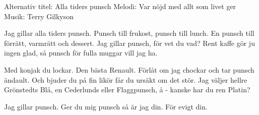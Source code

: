 \begin{song}

\begin{songmeta}
Alternativ titel: Alla tiders punsch
Melodi: Var nöjd med allt som livet ger
Musik: Terry Gilkyson
\end{songmeta}

\begin{songtext}
Jag gillar alla tiders punsch.
Punsch till frukost, punsch till lunch.
En punsch till förrätt, varmrätt och dessert.
Jag gillar punsch, för vet du vad?
Rent kaffe gör ju ingen glad,
så punsch för fulla muggar vill jag ha.

Med konjak du lockar.
Den bästa Renault.
Förlåt om jag chockar
och tar punsch ändault.
Och bjuder du på fin likör
får du ursäkt om det stör.
Jag väljer hellre Grönstedts Blå,
en Cederlunds eller Flaggpunsch, å
- kanske har du ren Platin?

Jag gillar punsch. Ger du mig punsch så är jag din.
För evigt din.
\end{songtext}
\end{song}
